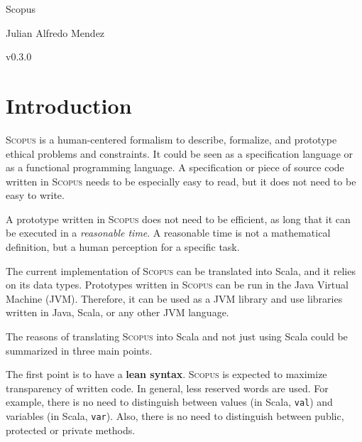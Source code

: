 \documentclass[12pt,a4paper]{book}
\newcommand{\srccode}[1]{\texttt{{#1}}}
\newcommand{\reservedWord}[1]{{\color{blue}\srccode{#1}}\xspace}
\newcommand{\scalaval}{\reservedWord{val}}
\newcommand{\scalavar}{\reservedWord{var}}
\newcommand{\Scopus}{\textsc{Scopus}\xspace}
\begin{document}

    \begin{center}

        \phantom{H}

        \vspace{80mm}

        {\huge{Scopus}}

        \vspace{80mm}
        Julian Alfredo Mendez

        \vspace{10mm}
        v0.3.0

    \end{center}

    \newpage


    \chapter{Introduction}

    \Scopus is a human-centered formalism to describe, formalize, and prototype ethical problems and constraints.
    It could be seen as a specification language or as a functional programming language.
    A specification or piece of source code written in \Scopus needs to be especially easy to read, but it does not need to be easy to write.

    A prototype written in \Scopus does not need to be efficient, as long that it can be executed in a \textit{reasonable time}.
    A reasonable time is not a mathematical definition, but a human perception for a specific task.

    The current implementation of \Scopus can be translated into Scala, and it relies on its data types.
    Prototypes written in \Scopus can be run in the Java Virtual Machine (JVM).
    Therefore, it can be used as a JVM library and use libraries written in Java, Scala, or any other JVM language.

    The reasons of translating \Scopus into Scala and not just using Scala could be summarized in three main points.

    The first point is to have a \textbf{lean syntax}.
    \Scopus is expected to maximize transparency of written code.
    In general, less reserved words are used.
    For example, there is no need to distinguish between values (in Scala, \scalaval) and variables (in Scala, \scalavar).
    Also, there is no need to distinguish between public, protected or private methods.
\end{document}
